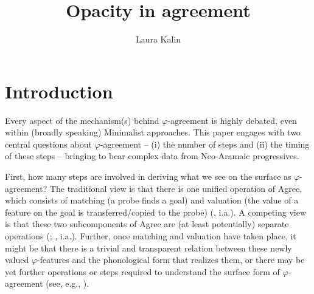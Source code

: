 \documentclass[output=paper
,modfonts
,nonflat]{langsci/langscibook}
\title{Opacity in agreement}
\author{Laura Kalin\affiliation{Princeton University}}
\begin{document}

\maketitle
\section{Introduction} \label{sec-kalin:1}

Every aspect of the mechanism(s) behind $\varphi$-agreement is highly debated, even within (broadly speaking) Minimalist approaches. This paper engages with two central questions about $\varphi$-agreement --  (i) the number of steps and (ii) the timing of these steps -- bringing to bear complex data from Neo-Aramaic progressives.

First, how many steps are involved in deriving what we see on the surface as $\varphi$-agreement? The traditional view is that there is one unified operation of Agree, which consists of matching (a probe finds a goal) and valuation (the value of a feature on the goal is transferred/copied to the probe) (\citealt{Chomsky00,Chomsky01,Bejar03,Preminger11,Preminger14}, i.a.). A competing view is that these two subcomponents of Agree are (at least potentially) separate operations (\citealt{vanKoppen07,BBP09,ArregiNevins12,BhattWalkow13,Bonet13,Marusicetal15, Smith17, AtlamazBakerTA}; , i.a.). Further, once matching and valuation have taken place, it might be that there is a trivial and transparent relation between these newly valued $\varphi$-features and the phonological form that realizes them, or there may be yet further operations or steps required to understand the surface form of $\varphi$-agreement (see, e.g., \citealt{ArregiNevins12}).
\end{document}

